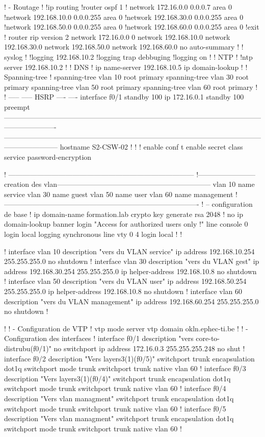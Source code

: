 \documentclass{article}
\begin{document}
{\begin{verbatimtab}[4]
! - Routage
!
!ip routing
!router ospf 1
! network 172.16.0.0 0.0.0.7 area 0
!network 192.168.10.0 0.0.0.255 area 0
!network 192.168.30.0 0.0.0.255 area 0
!network 192.168.50.0 0.0.0.255 area 0 
!network 192.168.60.0 0.0.0.255 area 0 
!exit      
! 
router rip
version 2 
network 172.16.0.0 0
network 192.168.10.0 
network 192.168.30.0 
network 192.168.50.0  
network 192.168.60.0 
no auto-summary
!
! syslog
!
!logging 192.168.10.2
!logging trap debbuging
!logging on
!
! NTP
!
!ntp server 192.168.10.2
! 
! DNS
!
ip name-server 192.168.10.5
ip domain-lookup
!
! Spanning-tree
!
spanning-tree vlan 10 root primary  
spanning-tree vlan 30 root primary 
spanning-tree vlan 50 root primary
spanning-tree vlan 60 root primary  
!
!
-----
-----
HSRP
----
----
interface f0/1
standby 100 ip 172.16.0.1
standby 100 preempt
----------------------------------------------------------------------------------------------------------------------------------
-----------------------------------------------------------------------------------------------------------------------------------
hostname S2-CSW-02
!
!
!
enable
conf t
enable secret class 
service password-encryption

! ------------------------------------------------------------------------------
!------------------------creation des vlan-----------------------------------------------------------------
vlan 10 name service
vlan 30 name guest
vlan 50 name user
vlan 60 name management
!----------------------------------------------------------------------------------
! – configuration de base 
!
ip domain-name formation.lab
crypto key generate rsa
2048
!
no ip domain-lookup
banner login "Access for authorized users only !"
line console 0
  login local
  logging synchronous
line vty 0 4
  login local
!
!

!
interface vlan 10
  description "vers du VLAN service"
  ip address 192.168.10.254 255.255.255.0
  no shutdown
!      
interface vlan 30
  description "vers du VLAN gest"
  ip address 192.168.30.254 255.255.255.0
  ip helper-address 192.168.10.8
  no shutdown
!
interface vlan 50
  description "vers du VLAN user"
  ip address 192.168.50.254 255.255.255.0
  ip helper-address 192.168.10.8
  no shutdown
!
interface vlan 60
  description "vers du VLAN management"
  ip address 192.168.60.254 255.255.255.0
  no shutdown
!

!
! - Configuration de VTP
!
vtp mode server
vtp domain okln.ephec-ti.be 
!
! - Configuration des interfaces
!       
interface f0/1
  description "vers core-to-distrubu(f0/1)"
  no switchport
  ip address 172.16.0.3 255.255.255.248
  no shut
!  
interface f0/2
  description "Vers layers3(1)(f0/5)"
  switchport trunk encapsulation dot1q
  switchport mode trunk
  switchport trunk native vlan 60
!
interface f0/3
  description "Vers layers3(1)(f0/4)"
  switchport trunk encapsulation dot1q
  switchport mode trunk
  switchport trunk native vlan 60
!
interface f0/4
  description "Vers vlan managment"
  switchport trunk encapsulation dot1q
  switchport mode trunk
  switchport trunk native vlan 60 
!
interface f0/5
  description "Vers vlan managment"
  switchport trunk encapsulation dot1q
  switchport mode trunk
  switchport trunk native vlan 60 
!
 

\end{verbatimtab}}
\end{document}
